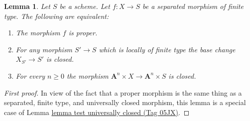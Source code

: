 \documentclass{amsart}
\theoremstyle{plain}
\newtheorem{lemma}[subsection]{Lemma}
\theoremstyle{definition}
\theoremstyle{remark}
\numberwithin{equation}{subsection}
\begin{document}
\begin{lemma}
\label{lemma-limited-base-change}
Let $S$ be a scheme.
Let $f : X \to S$ be a separated morphism of finite type.
The following are equivalent:
\begin{enumerate}
\item The morphism $f$ is proper.
\item For any morphism $S' \to S$ which is locally of finite type
the base change $X_{S'} \to S'$ is closed.
\item For every $n \geq 0$ the morphism
$\mathbf{A}^n \times X \to \mathbf{A}^n \times S$ is closed.
\end{enumerate}
\end{lemma}

\begin{proof}[First proof]
In view of the fact that a proper morphism is the same thing as
a separated, finite type, and universally closed morphism, this
lemma is a special case of Lemma \href{https://stacks.math.columbia.edu/tag/05JX}{lemma test universally closed (Tag 05JX)}.
\end{proof}
\end{document}

